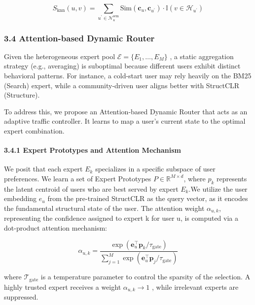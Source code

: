 \documentclass[]{article}
\let\oldparagraph\paragraph
\renewcommand{\paragraph}[1]{\oldparagraph{#1}\mbox{}}
\begin{document}
\[S_{\text{knn}}\left( u,v \right) = \sum_{u^{\prime} \in \mathcal{N}_{u}^{\text{sem}}}^{}\text{Sim}\left( \mathbf{c}_{u},\mathbf{c}_{u^{\prime}} \right) \cdot \mathbb{I}\left( v \in \mathcal{H}_{u^{\prime}} \right)\]

\hypertarget{attention-based-dynamic-router}{%
\subsubsection{3.4 Attention-based Dynamic
Router}\label{attention-based-dynamic-router}}

Given the heterogeneous expert pool
\(\mathcal{E} = \{ E_{1},\ldots,E_{M}\}\) , a static aggregation
strategy (e.g., averaging) is suboptimal because different users exhibit
distinct behavioral patterns. For instance, a cold-start user may rely
heavily on the BM25 (Search) expert, while a community-driven user
aligns better with StructCLR (Structure).

To address this, we propose an Attention-based Dynamic Router that acts
as an adaptive traffic controller. It learns to map a user's current
state to the optimal expert combination.

\hypertarget{expert-prototypes-and-attention-mechanism}{%
\paragraph{3.4.1 Expert Prototypes and Attention
Mechanism}\label{expert-prototypes-and-attention-mechanism}}

We posit that each expert \(E_{k}\) specializes in a specific subspace
of user preferences. We learn a set of Expert Prototypes
\(P \in \mathbb{R}^{M \times d}\), where \(p_{k}\) represents the latent
centroid of users who are best served by expert \(E_{k}\).We utilize the
user embedding \(e_{u}\) from the pre-trained StructCLR as the query
vector, as it encodes the fundamental structural state of the user. The
attention weight \(\alpha_{u,k}\), representing the confidence assigned
to expert k for user u, is computed via a dot-product attention
mechanism:

\[\alpha_{u,k} = \frac{\exp\left( \mathbf{e}_{u}^{\top}\mathbf{p}_{k}/\tau_{\text{gate}} \right)}{\sum_{j = 1}^{M}\exp\left( \mathbf{e}_{u}^{\top}\mathbf{p}_{j}/\tau_{\text{gate}} \right)}\]

where \(\mathcal{T}_{\text{gate}}\) is a temperature parameter to
control the sparsity of the selection. A highly trusted expert receives
a weight \(\alpha_{u,k} \rightarrow 1\) , while irrelevant experts are
suppressed.
\end{document}
